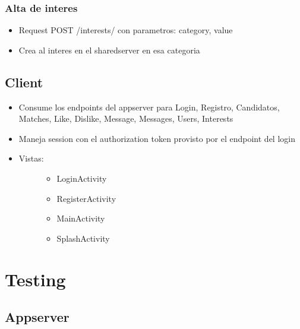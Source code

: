 \documentclass[letterpaper,10pt,english]{sphinxmanual}
\begin{document}
\subsubsection{Alta de interes}
\label{manuals:alta-de-interes}\begin{itemize}
\item {} 
Request POST /interests/ con parametros: category, value

\item {} 
Crea al interes en el sharedserver en esa categoria

\end{itemize}


\subsection{Client}
\label{manuals:client}\begin{itemize}
\item {} 
Consume los endpoints del appserver para Login, Registro, Candidatos, Matches, Like, Dislike, Message, Messages, Users, Interests

\item {} 
Maneja session con el authorization token provisto por el endpoint del login

\item {} \begin{description}
\item[{Vistas:}] \leavevmode\begin{itemize}
\item {} 
LoginActivity

\item {} 
RegisterActivity

\item {} 
MainActivity

\item {} 
SplashActivity

\end{itemize}

\end{description}

\end{itemize}


\section{Testing}
\label{manuals:testing}

\subsection{Appserver}
\label{manuals:id2}
\end{document}
